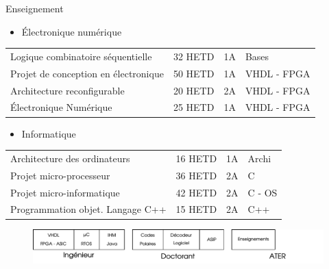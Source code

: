 \documentclass[t,compress,mathserif,12pt,xcolor=dvipsnames]{beamer}
\begin{document}
\begin{frame}[t]{Enseignement}
  \begin{minipage}[t][5.0cm][t]{\textwidth}
    \vspace{-0.5cm}
    \begin{itemize}
      \item<+-> \'Electronique numérique \\
    \end{itemize}
    \small{
      \begin{tabular}{ l l l l }
      Logique combinatoire s\'equentielle & 32 HETD & 1A & Bases       \\
      Projet de conception en \'electronique         & 50 HETD & 1A & VHDL - FPGA \\
      Architecture reconfigurable                    & 20 HETD & 2A & VHDL - FPGA \\
      \'Electronique Num\'erique                     & 25 HETD & 1A & VHDL - FPGA
    \end{tabular}
    }
    \vspace{0cm}
    \begin{itemize}
      \item<+-> Informatique
    \end{itemize}
    {
      \small{
      \begin{tabular}{ l l l l }
        Architecture des ordinateurs     & 16 HETD & 1A & Archi  \\
        Projet micro-processeur          & 36 HETD & 2A & C      \\
        Projet micro-informatique        & 42 HETD & 2A & C - OS \\
        Programmation objet. Langage C++ & 15 HETD & 2A & C++
      \end{tabular}
      }
    }
  \end{minipage}
  \begin{figure}[htp]
    \centering
    \includegraphics[width=\textwidth]{fig/frise8}
  \end{figure}
\end{frame}
\end{document}
